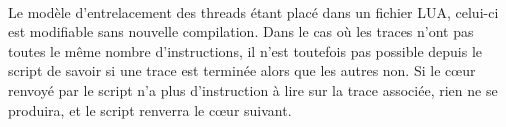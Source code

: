 
\paragraph{}
Le modèle d'entrelacement des threads étant placé dans un fichier LUA, celui-ci est modifiable sans nouvelle compilation. Dans le cas où les traces n'ont pas toutes le même nombre d'instructions, il n'est toutefois pas possible depuis le script de savoir si une trace est terminée alors que les autres non. Si le c\oe ur renvoyé par le script n'a plus d'instruction à lire sur la trace associée, rien ne se produira, et le script renverra le c\oe ur suivant. 

